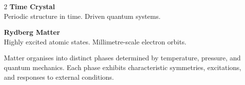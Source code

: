 \begin{center}
\begin{tcolorbox}
\begin{multicols}{2}
\textbf{Time Crystal}\\
{\footnotesize Periodic structure in time. Driven quantum systems.}\vspace{4pt}

\textbf{Rydberg Matter}\\
{\footnotesize Highly excited atomic states. Millimetre-scale electron orbits.}

\end{multicols}

\vspace{6pt}
Matter organises into distinct phases determined by temperature, pressure, and quantum mechanics. Each phase exhibits characteristic symmetries, excitations, and responses to external conditions.

\end{tcolorbox}
\end{center}
    
